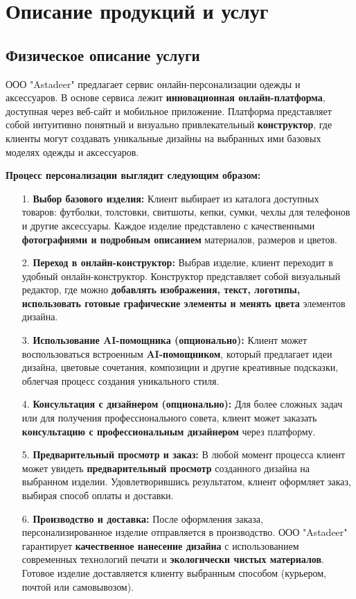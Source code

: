 \section{Описание продукций и услуг}

\subsection{Физическое описание услуги}

ООО "Astadeer" предлагает сервис онлайн-персонализации одежды и аксессуаров.  В основе сервиса лежит \textbf{инновационная онлайн-платформа}, доступная через веб-сайт и мобильное приложение.  Платформа представляет собой интуитивно понятный и визуально привлекательный \textbf{конструктор}, где клиенты могут создавать уникальные дизайны на выбранных ими базовых моделях одежды и аксессуаров.

\vspace{0.3cm}

\textbf{Процесс персонализации выглядит следующим образом:}

\begin{enumerate}
    \item [1. ] \textbf{Выбор базового изделия:} Клиент выбирает из каталога доступных товаров: футболки, толстовки, свитшоты, кепки, сумки, чехлы для телефонов и другие аксессуары.  Каждое изделие представлено с качественными \textbf{фотографиями и подробным описанием} материалов, размеров и цветов.
    \item [2. ] \textbf{Переход в онлайн-конструктор:}  Выбрав изделие, клиент переходит в удобный онлайн-конструктор.  Конструктор представляет собой визуальный редактор, где можно \textbf{добавлять изображения, текст, логотипы, использовать готовые графические элементы и менять цвета} элементов дизайна.
    \item [3. ] \textbf{Использование AI-помощника (опционально):}  Клиент может воспользоваться встроенным \textbf{AI-помощником}, который предлагает идеи дизайна, цветовые сочетания, композиции и другие креативные подсказки, облегчая процесс создания уникального стиля.
    \item [4. ] \textbf{Консультация с дизайнером (опционально):}  Для более сложных задач или для получения профессионального совета, клиент может заказать \textbf{консультацию с профессиональным дизайнером} через платформу.
    \item [5. ] \textbf{Предварительный просмотр и заказ:}  В любой момент процесса клиент может увидеть \textbf{предварительный просмотр} созданного дизайна на выбранном изделии.  Удовлетворившись результатом, клиент оформляет заказ, выбирая способ оплаты и доставки.
    \item [6. ] \textbf{Производство и доставка:}  После оформления заказа, персонализированное изделие отправляется в производство.  ООО "Astadeer" гарантирует \textbf{качественное нанесение дизайна} с использованием современных технологий печати и \textbf{экологически чистых материалов}.  Готовое изделие доставляется клиенту выбранным способом (курьером, почтой или самовывозом).
\end{enumerate}



